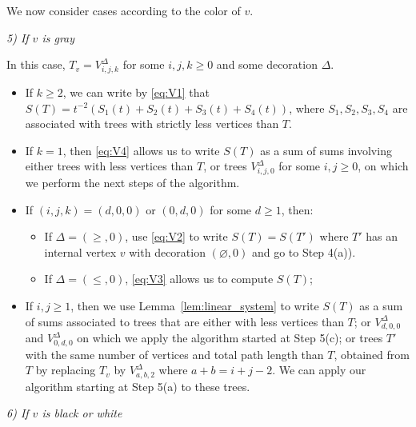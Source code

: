 \documentclass[12pt]{amsart}
\theoremstyle{plain}
\theoremstyle{remark}
\begin{document}
We now consider cases according to the color of $v$.

\emph{5) If $v$ is gray}

In this case, $T_v=V_{i,j,k}^{\Delta}$ for some $i,j,k \geq 0$ and some decoration $\Delta$.
\begin{itemize}
\item[5(a)] If $k\geq 2$, we can write by \eqref{eq:V1} that $S(T)=t^{-2}(S_1(t)+S_2(t)+S_3(t)+S_4(t))$, where $S_1,S_2,S_3,S_4$ are associated with trees with strictly less vertices than $T$.
\item[5(b)] If $k=1$, then \eqref{eq:V4} allows us to write $S(T)$ as a sum of sums involving either trees with less vertices than $T$, or trees $V_{i,j,0}^{\Delta}$ for some $i,j \geq 0$, on which we perform the next steps of the algorithm.
\item[5(c)] If $(i,j,k)=(d,0,0)$ or $(0,d,0)$ for some $d \geq 1$, then:
\begin{itemize}
\item[5(c).1] If $\Delta=(\geq,0)$, use \eqref{eq:V2} to write $S(T)=S(T')$ where $T'$ has an internal vertex $v$ with decoration $(\varnothing,0)$ and go to Step 4(a)).
\item[5(c).2] If $\Delta=(\leq,0)$, \eqref{eq:V3} allows us to compute $S(T)$;
\end{itemize}
\item[5(d)] If $i,j\geq 1$, then we use Lemma~\ref{lem:linear_system} to write $S(T)$ as a sum of sums associated to trees that are either with less vertices than $T$; or $V^{\Delta}_{d,0,0}$ and $V^{\Delta}_{0,d,0}$ on which we apply the algorithm started at Step 5(c); or trees $T'$ with the same number of vertices and total path length than $T$, obtained from $T$ by replacing $T_v$ by $V^{\Delta}_{a,b,2}$ where $a+b=i+j-2$. We can apply our algorithm starting at Step 5(a) to these trees.
\end{itemize}

\emph{6) If $v$ is black or white}
\end{document}

